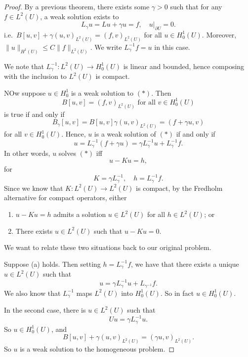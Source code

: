 \documentclass[a4paper]{article}
\begin{document}
\begin{proof}
  By a previous theorem, there exists some $\gamma > 0$ such that for any $f \in L^2(U)$, a weak solution exists to
  \[
    L_\gamma u = Lu + \gamma u = f,\quad u|_{\partial U} = 0.
  \]
  i.e.\ $B[u, v] + \gamma (u, v)_{L^2(U)} = (f, v)_{L^2(U)}$ for all $u \in H_0^1(U)$. Moreover, $\|u\|_{H^1(U)} \leq C \|f\|_{L^2(U)}$. We write $L_\gamma^{-1}f = u$ in this case.

  We note that $L_\gamma^{-1} : L^2(U) \to H_0^1(U)$ is linear and bounded, hence composing with the inclusion to $L^2(U)$ is compact.

  NOw suppose $u \in H_0^1$ is a weak solution to $(*)$. Then
  \[
    B[u, v] = (f, v)_{L^2(U)} \text{ for all }v \in H_0^1(U)
  \]
  is true if and only if
  \[
    B_\gamma[u, v] = B[u, v] \gamma(u, v)_{L^2(U)} = (f + \gamma u, v)
  \]
  for all $v \in H_0^1(U)$. Hence, $u$ is a weak solution of $(*)$ if and only if
  \[
    u = L_\gamma^{-1}(f + \gamma u) = \gamma L_\gamma^{-1} u + L_\gamma^{-1} f.
  \]
  In other words, $u$ solves $(*)$ iff
  \[
    u - Ku = h,
  \]
  for
  \[
    K = \gamma L_\gamma^{-1},\quad h = L_\gamma^{-1} f.
  \]
  Since we know that $K: L^2(U) \to L^2(U)$ is compact, by the Fredholm alternative for compact operators, either
  \begin{enumerate}
    \item $u - Ku = h$ admits a solution $u \in L^2(U)$ for all $h \in L^2(U)$; or
    \item There exists $u \in L^2(U)$ such that $u - Ku = 0$.
  \end{enumerate}
  We want to relate these two situations back to our original problem.

  Suppose (a) holds. Then setting $h = L_\gamma^{-1} f$, we have that there exists a unique $u \in L^2(U)$ such that
  \[
    u = \gamma L_\gamma^{-1} u + L_{\gamma^{-1}} f.
  \]
  We also know that $L_\gamma^{-1}$ maps $L^2(U)$ into $H_0^1(U)$. So in fact $u \in H_0^1(U)$.

  In the second case, there is $u \in L^2(U)$ such that
  \[
    Uu = \gamma L_\gamma^{-1} u.
  \]
  So $u \in H_0^1(U)$, and
  \[
    B[u, v] + \gamma (u, v)_{L^2(U)} = (\gamma u, v)_{L^2(U)}.
  \]
  So $u$ is a weak solution to the homogeneous problem.


\end{proof}
\end{document}
